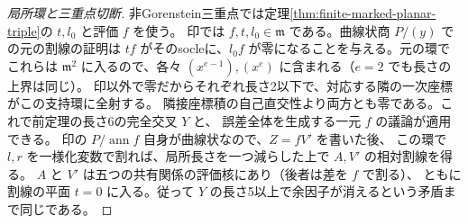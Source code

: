 \begin{proof}[局所環と三重点切断]
非Gorenstein三重点では定理\ref{thm:finite-marked-planar-triple}の $t,l_0$ と評価 $f$ を使う。
印では $f,t,l_0\in\mathfrak m$ である。曲線状商 $P/(y)$ での元の割線の証明は
$t f$ がそのsocleに、$l_0 f$ が零になることを与える。元の環でこれらは $\mathfrak m^2$
に入るので、各々 $(x^{e-1}),(x^e)$ に含まれる（$e=2$ でも長さの上界は同じ）。
印以外で零だからそれぞれ長さ2以下で、対応する隣の一次座標がこの支持環に全射する。
隣接座標積の自己直交性より両方とも零である。これで前定理の長さ6の完全交叉 $Y$ と、
誤差全体を生成する一元 $f$ の議論が適用できる。
印の $P/\operatorname{ann} f$ 自身が曲線状なので、$Z=fV'$ を書いた後、
この環で $l,r$ を一様化変数で割れば、局所長さを一つ減らした上で $A,V'$ の相対割線を得る。
$A$ と $V'$ は五つの共有関係の評価核にあり（後者は差を $f$ で割る）、
ともに割線の平面 $t=0$ に入る。従って $Y$ の長さ5以上で余因子が消えるという矛盾まで同じである。
\end{proof}

